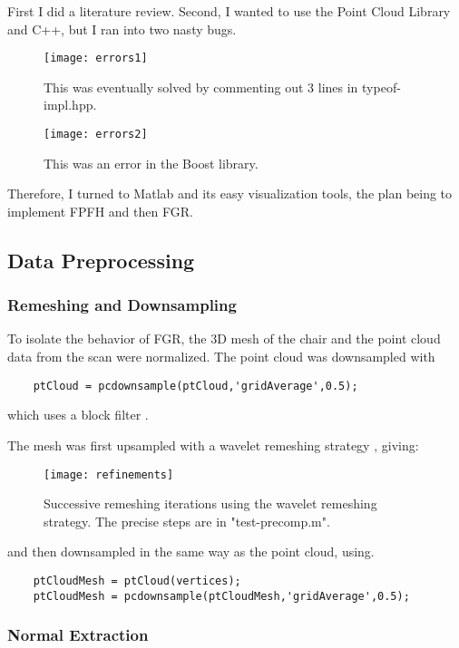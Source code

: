 \documentclass[10pt,a4paper]{article}
\begin{document}
First I did a literature review. Second, I wanted to use the Point Cloud Library and C++, but I ran into two nasty bugs. 

\begin{figure}[h!]
	\centering
	\texttt{[image: errors1]}
	\caption{This was eventually solved by commenting out 3 lines in typeof-impl.hpp.}
	\label{fig:errors1}
\end{figure}

\begin{figure}[h!]
	\centering
	\texttt{[image: errors2]}
	\caption{This was an error in the Boost library.}
	\label{fig:errors1}
\end{figure}

Therefore, I turned to Matlab and its easy visualization tools, the plan being to implement FPFH and then FGR. 
\newpage
\subsection{Data Preprocessing}
\subsubsection{Remeshing and Downsampling}
To isolate the behavior of FGR, the 3D mesh of the chair and the point cloud data from the scan were normalized. The point cloud was downsampled with 
\begin{lstlisting}
	ptCloud = pcdownsample(ptCloud,'gridAverage',0.5);
\end{lstlisting}
which uses a block filter \cite{Downsamp90:online}. 

The mesh was first upsampled with a wavelet remeshing strategy \cite{ToolboxW88:online}, giving:

\begin{figure}[h!]
	\centering
	\centerline{
	\texttt{[image: refinements]}}
	\caption{Successive remeshing iterations using the wavelet remeshing strategy. The precise steps are in "test-precomp.m".}
	\label{fig:refinements}
\end{figure}
 and then downsampled in the same way as the point cloud, using. 
\begin{lstlisting}
	ptCloudMesh = ptCloud(vertices);
	ptCloudMesh = pcdownsample(ptCloudMesh,'gridAverage',0.5);
\end{lstlisting}

\newpage

\subsubsection{Normal Extraction}
\end{document}
